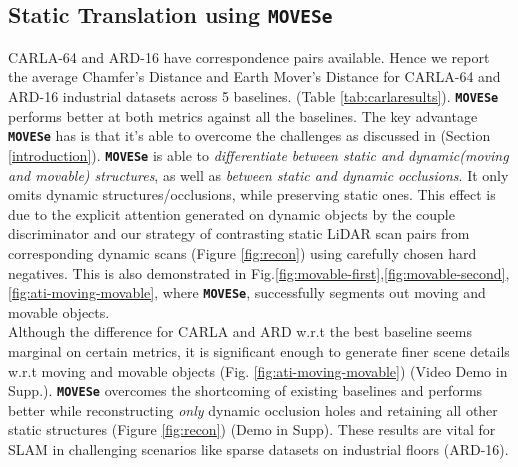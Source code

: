 \documentclass[10pt,twocolumn,letterpaper]{article}
\newcommand{\dslr}{\texttt{\textbf{MOVESe}}}
\begin{document}
\subsection{
Static Translation using \dslr{}}
\label{sec:chamfer-nu}
CARLA-64 and ARD-16 have correspondence pairs available.
Hence we report the average Chamfer's Distance and Earth Mover's Distance for CARLA-64 and ARD-16 industrial datasets across 5 baselines. (Table \ref{tab:carlaresults}). \dslr{}
performs better at both metrics against all the baselines.
The key advantage \dslr{} has is that it's able to overcome the challenges as discussed in (Section \ref{introduction}). \dslr{} is able to \textit{differentiate between static and dynamic(moving and movable) structures}, as well as \textit{between static and dynamic occlusions}. It only omits dynamic structures/occlusions, while preserving static ones. This effect is due to the explicit attention generated on dynamic objects by the couple discriminator and our  strategy of contrasting static LiDAR scan pairs from corresponding dynamic scans (Figure \ref{fig:recon}) using carefully chosen hard negatives. This is also demonstrated in Fig.\ref{fig:movable-first},\ref{fig:movable-second},\ref{fig:ati-moving-movable}, where \dslr{}, successfully segments out moving and movable objects.\\ Although the difference for CARLA and ARD w.r.t the best baseline seems marginal on certain metrics, it is significant enough to generate finer scene details w.r.t moving and movable objects (Fig. \ref{fig:ati-moving-movable}) (Video Demo in Supp.). \dslr{} overcomes the shortcoming of existing baselines and performs better while reconstructing \textit{only} dynamic occlusion holes and retaining all other static structures (Figure \ref{fig:recon}) (Demo in Supp). These results are vital for SLAM in challenging scenarios like sparse datasets on industrial floors (ARD-16).
\end{document}
